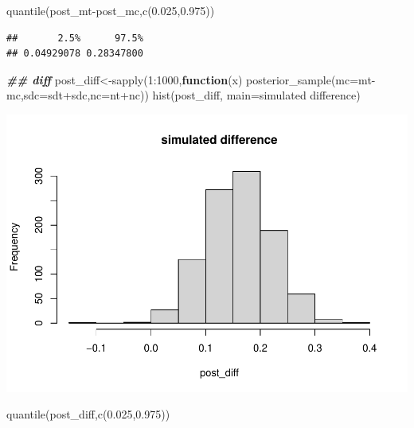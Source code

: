 \documentclass[
]{book}
\newenvironment{Shaded}{\begin{snugshade}}{\end{snugshade}}
\newcommand{\AttributeTok}[1]{\textcolor[rgb]{0.77,0.63,0.00}{#1}}
\newcommand{\ControlFlowTok}[1]{\textcolor[rgb]{0.13,0.29,0.53}{\textbf{#1}}}
\newcommand{\DecValTok}[1]{\textcolor[rgb]{0.00,0.00,0.81}{#1}}
\newcommand{\DocumentationTok}[1]{\textcolor[rgb]{0.56,0.35,0.01}{\textbf{\textit{#1}}}}
\newcommand{\FloatTok}[1]{\textcolor[rgb]{0.00,0.00,0.81}{#1}}
\newcommand{\FunctionTok}[1]{\textcolor[rgb]{0.00,0.00,0.00}{#1}}
\newcommand{\NormalTok}[1]{#1}
\newcommand{\OtherTok}[1]{\textcolor[rgb]{0.56,0.35,0.01}{#1}}
\newcommand{\SpecialCharTok}[1]{\textcolor[rgb]{0.00,0.00,0.00}{#1}}
\newcommand{\StringTok}[1]{\textcolor[rgb]{0.31,0.60,0.02}{#1}}
\theoremstyle{definition}
\theoremstyle{definition}
\theoremstyle{definition}
\theoremstyle{definition}
\theoremstyle{remark}
\begin{document}
\begin{Shaded}
\begin{Highlighting}[]
         \FunctionTok{quantile}\NormalTok{(post\_mt}\SpecialCharTok{{-}}\NormalTok{post\_mc,}\FunctionTok{c}\NormalTok{(}\FloatTok{0.025}\NormalTok{,}\FloatTok{0.975}\NormalTok{))}
\end{Highlighting}
\end{Shaded}

\begin{verbatim}
##       2.5%      97.5% 
## 0.04929078 0.28347800
\end{verbatim}

\begin{Shaded}
\begin{Highlighting}[]
  \DocumentationTok{\#\# diff}
\NormalTok{         post\_diff}\OtherTok{\textless{}{-}}\FunctionTok{sapply}\NormalTok{(}\DecValTok{1}\SpecialCharTok{:}\DecValTok{1000}\NormalTok{,}\ControlFlowTok{function}\NormalTok{(x) }\FunctionTok{posterior\_sample}\NormalTok{(}\AttributeTok{mc=}\NormalTok{mt}\SpecialCharTok{{-}}\NormalTok{mc,}\AttributeTok{sdc=}\NormalTok{sdt}\SpecialCharTok{+}\NormalTok{sdc,}\AttributeTok{nc=}\NormalTok{nt}\SpecialCharTok{+}\NormalTok{nc))}
    \FunctionTok{hist}\NormalTok{(post\_diff, }\AttributeTok{main=}\StringTok{\textquotesingle{}simulated difference\textquotesingle{}}\NormalTok{)}
\end{Highlighting}
\end{Shaded}

\includegraphics{_main_files/figure-latex/unnamed-chunk-32-2.pdf}

\begin{Shaded}
\begin{Highlighting}[]
             \FunctionTok{quantile}\NormalTok{(post\_diff,}\FunctionTok{c}\NormalTok{(}\FloatTok{0.025}\NormalTok{,}\FloatTok{0.975}\NormalTok{))}
\end{Highlighting}
\end{Shaded}
\end{document}
